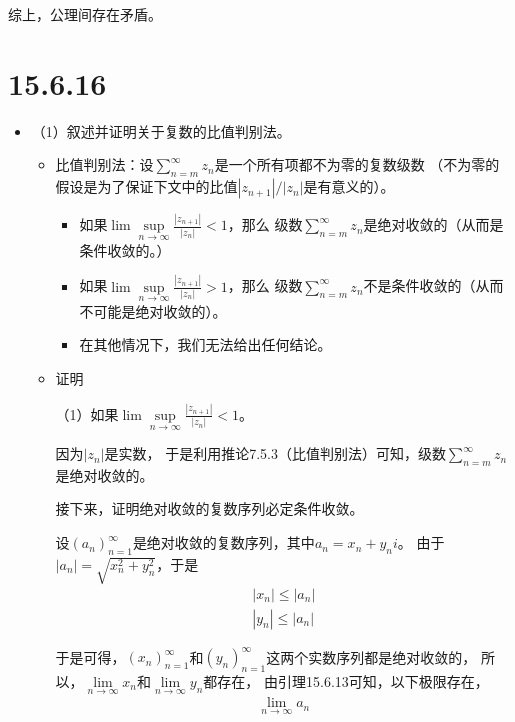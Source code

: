 \documentclass{article}
\begin{document}
综上，公理间存在矛盾。

\section*{15.6.16}

\begin{itemize}
  \item （1）叙述并证明关于复数的比值判别法。

        \begin{itemize}
          \item 比值判别法：设$\sum\limits_{n = m}^\infty z_n$是一个所有项都不为零的复数级数
                （不为零的假设是为了保证下文中的比值$|z_{n + 1}|/|z_n|$是有意义的）。

                \begin{itemize}
                  \item 如果$\lim\sup\limits_{n \to \infty} \frac{|z_{n + 1}|}{|z_n|} < 1$，那么
                        级数$\sum\limits_{n = m}^\infty z_n$是绝对收敛的（从而是条件收敛的。）
                  \item 如果$\lim\sup\limits_{n \to \infty} \frac{|z_{n + 1}|}{|z_n|} > 1$，那么
                        级数$\sum\limits_{n = m}^\infty z_n$不是条件收敛的（从而不可能是绝对收敛的）。
                  \item 在其他情况下，我们无法给出任何结论。
                \end{itemize}

          \item 证明

                （1）如果$\lim\sup\limits_{n \to \infty} \frac{|z_{n + 1}|}{|z_n|} < 1$。

                因为$|z_n|$是实数，
                于是利用推论7.5.3（比值判别法）可知，级数$\sum\limits_{n = m}^\infty z_n$是绝对收敛的。

                接下来，证明绝对收敛的复数序列必定条件收敛。

                设$(a_n)_{n = 1}^\infty$是绝对收敛的复数序列，其中$a_n = x_n + y_n i$。
                由于$|a_n| = \sqrt{x_n^2 + y_n^2}$，于是
                \begin{align*}
                  |x_n| \leq |a_n| \\
                  |y_n| \leq |a_n|
                \end{align*}

                于是可得，$(x_n)_{n = 1}^\infty$和$(y_n)_{n = 1}^\infty$这两个实数序列都是绝对收敛的，
                所以，$\lim\limits_{n \to \infty} x_n$和$\lim\limits_{n \to \infty} y_n$都存在，
                由引理15.6.13可知，以下极限存在，
                \begin{align*}
                  \lim\limits_{n \to \infty} a_n
                \end{align*}


\end{itemize}
\end{itemize}
\end{document}
